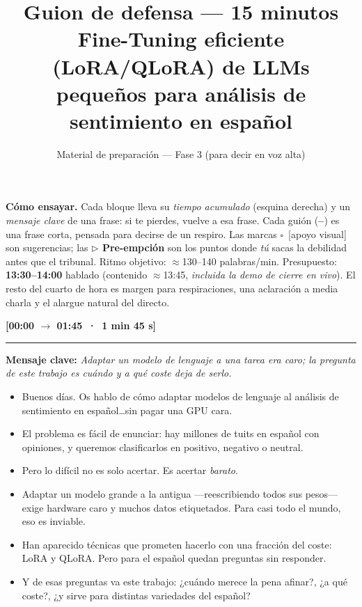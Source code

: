 \documentclass[11pt,a4paper]{article}
\title{\textbf{Guion de defensa --- 15 minutos}\\[2pt]
\large Fine-Tuning eficiente (LoRA/QLoRA) de LLMs pequeños para análisis de sentimiento en español}
\author{Material de preparación --- Fase 3 (para decir en voz alta)}
\date{}
\newcommand{\bloque}[2]{\medskip\noindent{\large\textbf{\textcolor{blue!45!black}{#1}}}\hfill{\small\textbf{[#2]}}\par
  \nopagebreak\rule{\linewidth}{0.4pt}\par\nopagebreak\smallskip}
\newcommand{\clave}[1]{\noindent\textbf{Mensaje clave:} \emph{#1}\par\smallskip}
\newcommand{\visual}[1]{\noindent{\footnotesize\textcolor{teal!60!black}{$\square$~[apoyo visual]: #1}}\par\smallskip}
\newenvironment{decir}{\begin{itemize}[label=\textbf{--},leftmargin=1.3em,itemsep=2.5pt,topsep=3pt]}{\end{itemize}}
\begin{document}
\maketitle

\noindent\textbf{Cómo ensayar.} Cada bloque lleva su \emph{tiempo acumulado} (esquina derecha) y un
\emph{mensaje clave} de una frase: si te pierdes, vuelve a esa frase. Cada gui\'on (\textbf{--}) es
una frase corta, pensada para decirse de un respiro. Las marcas {\footnotesize\textcolor{teal!60!black}{$\square$~[apoyo visual]}}
son sugerencias; las {\footnotesize\textcolor{red!55!black}{\textbf{$\triangleright$ Pre-empción}}} son
los puntos donde \emph{tú} sacas la debilidad antes que el tribunal. Ritmo objetivo: $\approx$130--140
palabras/min. Presupuesto: \textbf{13:30--14:00} hablado (contenido $\approx$13:45, \emph{incluida la demo de cierre en vivo}). El resto
del cuarto de hora es margen para respiraciones, una aclaración a media charla y el alargue natural
del directo.

\bloque{1. Problema}{00:00 $\rightarrow$ 01:45 \,·\, 1 min 45 s}
\clave{Adaptar un modelo de lenguaje a una tarea era caro; la pregunta de este trabajo es cuándo y a qué coste deja de serlo.}
\visual{Título + tres tuits de ejemplo etiquetados +/$\,$neutral$\,$/$-$.}
\begin{decir}
  \item Buenos días. Os hablo de cómo adaptar modelos de lenguaje al análisis de sentimiento en español\ldots sin pagar una GPU cara.
  \item El problema es fácil de enunciar: hay millones de tuits en español con opiniones, y queremos clasificarlos en positivo, negativo o neutral.
  \item Pero lo difícil no es solo acertar. Es acertar \emph{barato}.
  \item Adaptar un modelo grande a la antigua ---reescribiendo todos sus pesos--- exige hardware caro y muchos datos etiquetados. Para casi todo el mundo, eso es inviable.
  \item Han aparecido técnicas que prometen hacerlo con una fracción del coste: LoRA y QLoRA. Pero para el español quedan preguntas sin responder.
  \item Y de esas preguntas va este trabajo: ¿cuándo merece la pena afinar?, ¿a qué coste?, ¿y sirve para distintas variedades del español?
\end{decir}
\end{document}
